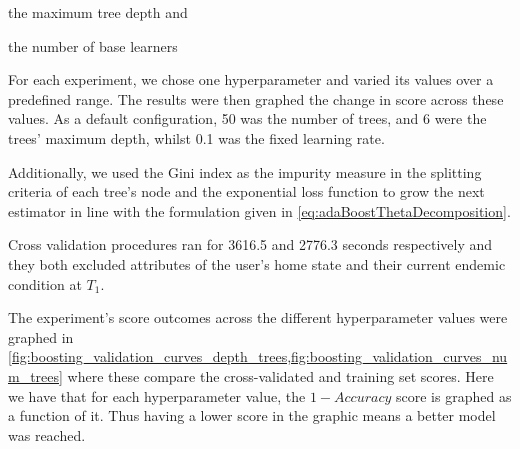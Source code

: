 \begin{enumerate*}[label={\alph*)},]
\item the maximum tree depth and
\item the number of base learners
\end{enumerate*}

For each experiment, we chose one hyperparameter and varied its values over a predefined range.
The results were then graphed the change in score across these values.
As a default configuration, 50 was the number of trees, and 6 were the trees' maximum depth, whilst 0.1 was the fixed learning rate.

Additionally, we used the Gini index as the impurity measure in the splitting criteria of each tree's node and the exponential loss function to grow the next estimator in line with the formulation given in \cref{eq:adaBoostThetaDecomposition}.

Cross validation procedures ran for 3616.5 and 2776.3 seconds respectively and they both excluded attributes of the user's home state and their current endemic condition at $T_1$.

The experiment's score outcomes across the different hyperparameter values were graphed in \cref{fig:boosting_validation_curves_depth_trees,fig:boosting_validation_curves_num_trees} where these compare the cross-validated and training set scores.
Here we have that for each hyperparameter value, the $1 - Accuracy$ score is graphed as a function of it.
Thus having a lower score in the graphic means a better model was reached.

